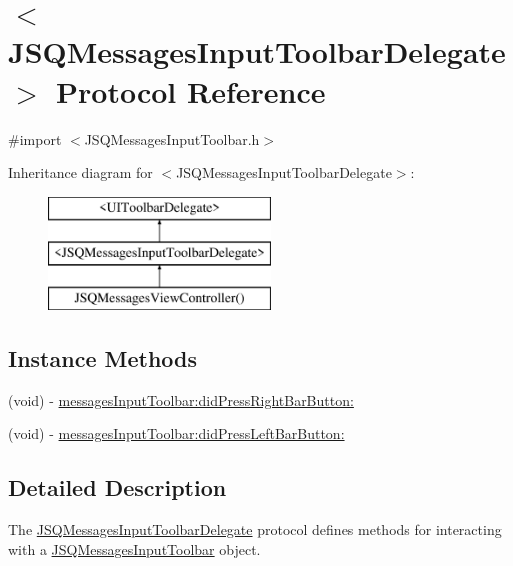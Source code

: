 \hypertarget{protocol_j_s_q_messages_input_toolbar_delegate-p}{}\section{$<$J\+S\+Q\+Messages\+Input\+Toolbar\+Delegate$>$ Protocol Reference}
\label{protocol_j_s_q_messages_input_toolbar_delegate-p}


{\ttfamily \#import $<$J\+S\+Q\+Messages\+Input\+Toolbar.\+h$>$}

Inheritance diagram for $<$J\+S\+Q\+Messages\+Input\+Toolbar\+Delegate$>$\+:\begin{figure}[H]
\begin{center}
\leavevmode
\includegraphics[height=3.000000cm]{protocol_j_s_q_messages_input_toolbar_delegate-p}
\end{center}
\end{figure}
\subsection*{Instance Methods}
\begin{DoxyCompactItemize}
\item 
(void) -\/ \hyperlink{protocol_j_s_q_messages_input_toolbar_delegate-p_afec79b6e52ce388aae965b3da688202d}{messages\+Input\+Toolbar\+:did\+Press\+Right\+Bar\+Button\+:}
\item 
(void) -\/ \hyperlink{protocol_j_s_q_messages_input_toolbar_delegate-p_ab017c6e059430aabf114df17d0ed0df2}{messages\+Input\+Toolbar\+:did\+Press\+Left\+Bar\+Button\+:}
\end{DoxyCompactItemize}


\subsection{Detailed Description}
The {\ttfamily \hyperlink{protocol_j_s_q_messages_input_toolbar_delegate-p}{J\+S\+Q\+Messages\+Input\+Toolbar\+Delegate}} protocol defines methods for interacting with a {\ttfamily \hyperlink{interface_j_s_q_messages_input_toolbar}{J\+S\+Q\+Messages\+Input\+Toolbar}} object. 

